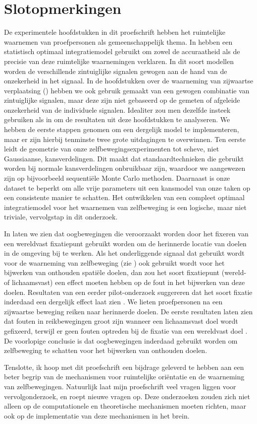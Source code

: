 \section{Slotopmerkingen}

De experimentele hoofdstukken in dit proefschrift hebben het ruimtelijke waarnemen van proefpersonen als gemeenschappelijk thema. In  hebben een statistisch optimaal integratiemodel gebruikt om zowel de accuraatheid als de precisie van deze ruimtelijke waarnemingen verklaren. In dit soort modellen worden de verschillende zintuiglijke signalen gewogen aan de hand van de onzekerheid in het signaal. In de hoofdstukken over de waarneming van zijwaartse verplaatsing () hebben we ook gebruik gemaakt van een gewogen combinatie van zintuiglijke signalen, maar deze zijn niet gebaseerd op de gemeten of afgeleide onzekerheid van de individuele signalen. Idealiter zou men dezelfde insteek gebruiken als in  om de resultaten uit deze hoofdstukken te analyseren. We hebben de eerste stappen genomen om een dergelijk model te implementeren, maar er zijn hierbij tenminste twee grote uitdagingen te overwinnen. Ten eerste leidt de geometrie van onze zelfbewegingsexperimenten tot scheve, niet Gaussiaanse, kansverdelingen. Dit maakt dat standaardtechnieken die gebruikt worden bij normale kansverdelingen onbruikbaar zijn, waardoor we aangewezen zijn op bijvoorbeeld sequenti\"ele Monte Carlo methoden. Daarnaast is onze dataset te beperkt om alle vrije parameters uit een kansmodel van onze taken op een consistente manier te schatten. Het ontwikkelen van een compleet optimaal integratiemodel voor het waarnemen van zelfbeweging is een logische, maar niet triviale, vervolgstap in dit onderzoek.

In  laten we zien dat oogbewegingen die veroorzaakt worden door het fixeren van een wereldvast fixatiepunt gebruikt worden om de herinnerde locatie van doelen in de omgeving bij te werken. Als het onderliggende signaal dat gebruikt wordt voor de waarneming van zelfbeweging (zie ) ook gebruikt wordt voor het bijwerken van onthouden spati\"ele doelen, dan zou het soort fixatiepunt (wereld- of lichaamsvast) een effect moeten hebben op de fout in het bijwerken van deze doelen. Resultaten van een eerder pilot-onderzoek suggereren dat het soort fixatie inderdaad een dergelijk effect laat zien \cite{clemens2010}. We lieten proefpersonen na een zijwaartse beweging reiken naar herinnerde doelen. De eerste resultaten laten zien dat fouten in reikbewegingen groot zijn wanneer een lichaamsvast doel wordt gefixeerd, terwijl er geen fouten optreden bij de fixatie van een wereldvast doel \cite{clemens2010}. De voorlopige conclusie is dat oogbewegingen inderdaad gebruikt worden om zelfbeweging te schatten voor het bijwerken van onthouden doelen.

Tenslotte, ik hoop met dit proefschrift een bijdrage geleverd te hebben aan een beter begrip van de mechanismen voor ruimtelijke ori\"entatie en de waarneming van zelfbewegingen. Natuurlijk laat mijn proefschrift veel vragen liggen voor vervolgonderzoek, en roept nieuwe vragen op. Deze onderzoeken zouden zich niet alleen op de computationele en theoretische mechanismen moeten richten, maar ook op de implementatie van deze mechanismen in het brein.
